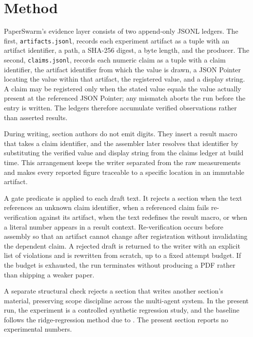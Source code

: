 \section{Method}

PaperSwarm's evidence layer consists of two append-only JSONL ledgers. The first, \texttt{artifacts.jsonl}, records each experiment artifact as a tuple with an artifact identifier, a path, a SHA-256 digest, a byte length, and the producer. The second, \texttt{claims.jsonl}, records each numeric claim as a tuple with a claim identifier, the artifact identifier from which the value is drawn, a JSON Pointer locating the value within that artifact, the registered value, and a display string. A claim may be registered only when the stated value equals the value actually present at the referenced JSON Pointer; any mismatch aborts the run before the entry is written. The ledgers therefore accumulate verified observations rather than asserted results.

During writing, section authors do not emit digits. They insert a result macro that takes a claim identifier, and the assembler later resolves that identifier by substituting the verified value and display string from the claims ledger at build time. This arrangement keeps the writer separated from the raw measurements and makes every reported figure traceable to a specific location in an immutable artifact.

A gate predicate is applied to each draft text. It rejects a section when the text references an unknown claim identifier, when a referenced claim fails re-verification against its artifact, when the text redefines the result macro, or when a literal number appears in a result context. Re-verification occurs before assembly so that an artifact cannot change after registration without invalidating the dependent claim. A rejected draft is returned to the writer with an explicit list of violations and is rewritten from scratch, up to a fixed attempt budget. If the budget is exhausted, the run terminates without producing a PDF rather than shipping a weaker paper.

A separate structural check rejects a section that writes another section's material, preserving scope discipline across the multi-agent system. In the present run, the experiment is a controlled synthetic regression study, and the baseline follows the ridge-regression method due to \citet{hoerl1970ridge}. The present section reports no experimental numbers.
